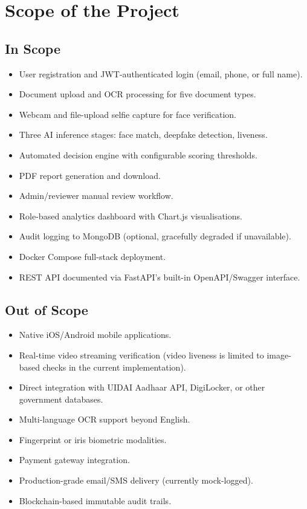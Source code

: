 \documentclass[12pt,a4paper]{report}
\begin{document}
\section{Scope of the Project}

\subsection{In Scope}
\begin{itemize}
    \item User registration and JWT-authenticated login (email, phone, or full name).
    \item Document upload and OCR processing for five document types.
    \item Webcam and file-upload selfie capture for face verification.
    \item Three AI inference stages: face match, deepfake detection, liveness.
    \item Automated decision engine with configurable scoring thresholds.
    \item PDF report generation and download.
    \item Admin/reviewer manual review workflow.
    \item Role-based analytics dashboard with Chart.js visualisations.
    \item Audit logging to MongoDB (optional, gracefully degraded if unavailable).
    \item Docker Compose full-stack deployment.
    \item REST API documented via FastAPI's built-in OpenAPI/Swagger interface.
\end{itemize}

\subsection{Out of Scope}
\begin{itemize}
    \item Native iOS/Android mobile applications.
    \item Real-time video streaming verification (video liveness is limited to image-based checks in the current implementation).
    \item Direct integration with UIDAI Aadhaar API, DigiLocker, or other government databases.
    \item Multi-language OCR support beyond English.
    \item Fingerprint or iris biometric modalities.
    \item Payment gateway integration.
    \item Production-grade email/SMS delivery (currently mock-logged).
    \item Blockchain-based immutable audit trails.
\end{itemize}
\end{document}
